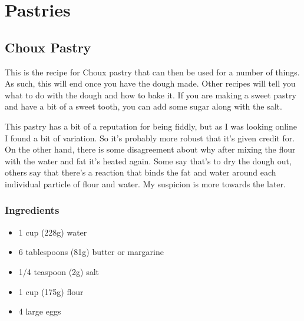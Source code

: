 \documentclass[10pt, openany]{book}
\begin{document}
\chapter{Pastries}
\section{Choux Pastry}
\label{pastry:choux}
This is the recipe for Choux pastry that can then be used for a number of things.  As such, this will end once you have the dough made.  Other recipes will tell you what to do with the dough and how to bake it.  If you are making a sweet pastry and have a bit of a sweet tooth, you can add some sugar along with the salt.

This pastry has a bit of a reputation for being fiddly, but as I was looking online I found a bit of variation.  So it's probably more robust that it's given credit for.  On the other hand, there is some disagreement about why after mixing the flour with the water and fat it's heated again.  Some say that's to dry the dough out, others say that there's a reaction that binds the fat and water around each individual particle of flour and water.  My suspicion is more towards the later.

\subsection{Ingredients}
\begin{itemize}
  \item 1 cup (228g) water
  \item 6 tablespoons (81g) butter or margarine
  \item 1/4 teaspoon (2g) salt
  \item 1 cup (175g) flour
  \item 4 large eggs
\end{itemize}
\end{document}
